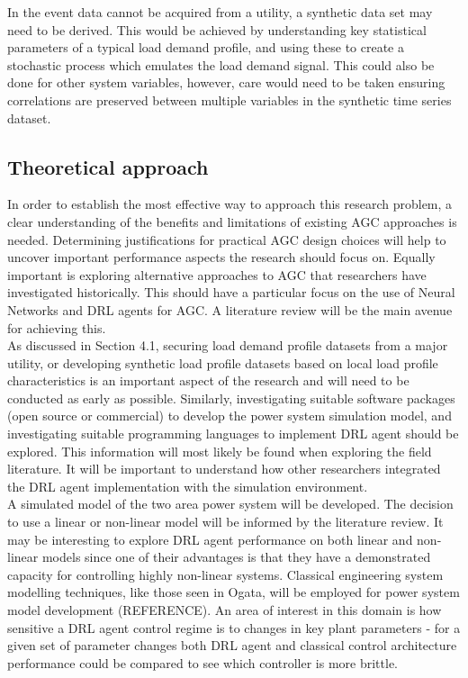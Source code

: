 \documentclass[12pt, a4paper]{article}
\begin{document}
In the event data cannot be acquired from a utility, a synthetic data set may need to be derived. This would be achieved by understanding key statistical parameters of a typical load demand profile, and using these to create a stochastic process which emulates the load demand signal. This could also be done for other system variables, however, care would need to be taken ensuring correlations are preserved between multiple variables in the synthetic time series dataset.

\subsection{Theoretical approach}
In order to establish the most effective way to approach this research problem, a clear understanding of the benefits and limitations of existing AGC approaches is needed. Determining justifications for practical AGC design choices will help to uncover important performance aspects the research should focus on. Equally important is exploring alternative approaches to AGC that researchers have investigated historically. This should have a particular focus on the use of Neural Networks and DRL agents for AGC. A literature review will be the main avenue for achieving this.\\

As discussed in Section 4.1, securing load demand profile datasets from a major utility, or developing synthetic load profile datasets based on local load profile characteristics is an important aspect of the research and will need to be conducted as early as possible. Similarly, investigating suitable software packages (open source or commercial) to develop the power system simulation model, and investigating suitable programming languages to implement DRL agent should be explored. This information will most likely be found when exploring the field literature. It will be important to understand how other researchers integrated the DRL agent implementation with the simulation environment.\\

A simulated model of the two area power system will be developed. The decision to use a linear or non-linear model will be informed by the literature review. It may be interesting to explore DRL agent performance on both linear and non-linear models since one of their advantages is that they have a demonstrated capacity for controlling highly non-linear systems. Classical engineering system modelling techniques, like those seen in Ogata, will be employed for power system model development (REFERENCE). An area of interest in this domain is how sensitive a DRL agent control regime is to changes in key plant parameters - for a given set of parameter changes both DRL agent and classical control architecture performance could be compared to see which controller is more brittle.\\
\end{document}
